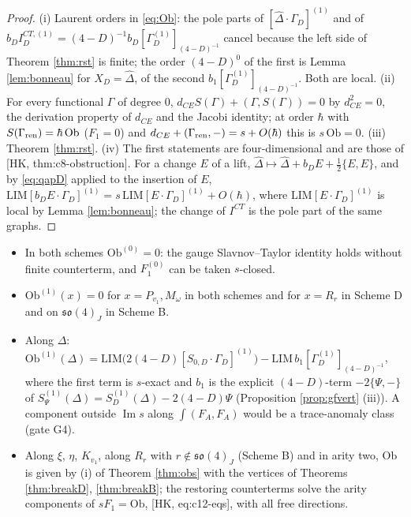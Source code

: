 \begin{proof}
(i) Laurent orders in \eqref{eq:Ob}: the pole parts of $[\widehat\Delta\cdot\Gamma_D]^{(1)}$ and of $b_DI^{CT,(1)}_D=(4-D)^{-1}b_D[\Gamma^{(1)}_D]_{(4-D)^{-1}}$ cancel because the left side of Theorem \ref{thm:rst} is finite; the order $(4-D)^0$ of the first is Lemma \ref{lem:bonneau} for $X_D=\widehat\Delta$, of the second $b_1[\Gamma^{(1)}_D]_{(4-D)^{-1}}$. Both are local. (ii) For every functional $\Gamma$ of degree $0$, $d_{CE}S(\Gamma)+(\Gamma,S(\Gamma))=0$ by $d_{CE}^2=0$, the derivation property of $d_{CE}$ and the Jacobi identity; at order $\hbar$ with $S(\Gamma_{\rm ren})=\hbar\,\mathrm{Ob}$ ($F_1=0$) and $d_{CE}+(\Gamma_{\rm ren},-)=s+O(\hbar)$ this is $s\,\mathrm{Ob}=0$. (iii) Theorem \ref{thm:rst}. (iv) The first statements are four-dimensional and are those of [HK, thm:c8-obstruction]. For a change $E$ of a lift, $\widehat\Delta\mapsto\widehat\Delta+b_DE+\frac12\{E,E\}$, and by \eqref{eq:qapD} applied to the insertion of $E$, $\mathrm{LIM}[b_DE\cdot\Gamma_D]^{(1)}=s\,\mathrm{LIM}[E\cdot\Gamma_D]^{(1)}+O(\hbar)$, where $\mathrm{LIM}[E\cdot\Gamma_D]^{(1)}$ is local by Lemma \ref{lem:bonneau}; the change of $I^{CT}$ is the pole part of the same graphs.
\end{proof}

\begin{theorem}
\label{thm:restore}
\mbox{}\begin{itemize}
\item[(i)] In both schemes $\mathrm{Ob}^{(0)}=0$: the gauge Slavnov--Taylor identity holds without finite counterterm, and $F^{(0)}_1$ can be taken $s$-closed.
\item[(ii)] $\mathrm{Ob}^{(1)}(x)=0$ for $x=P_{v_1},M_\omega$ in both schemes and for $x=R_r$ in Scheme D and on $\mathfrak{so}(4)_J$ in Scheme B.
\item[(iii)] Along $\Delta$: $\mathrm{Ob}^{(1)}(\Delta)=\mathrm{LIM}\big(2(4-D)[S_{0,D}\cdot\Gamma_D]^{(1)}\big)-\mathrm{LIM}\,b_1[\Gamma^{(1)}_D]_{(4-D)^{-1}}$, where the first term is $s$-exact and $b_1$ is the explicit $(4-D)$-term $-2\{\Psi,-\}$ of $S^{(1)}_\Psi(\Delta)=S^{(1)}_D(\Delta)-2(4-D)\Psi$ (Proposition \ref{prop:gfvert} (iii)). A component outside $\operatorname{Im}s$ along $\int(F_A,F_A)$ would be a trace-anomaly class (gate G4).
\item[(iv)] Along $\xi$, $\eta$, $K_{v_1}$, along $R_r$ with $r\notin\mathfrak{so}(4)_J$ (Scheme B) and in arity two, $\mathrm{Ob}$ is given by (i) of Theorem \ref{thm:obs} with the vertices of Theorems \ref{thm:breakD}, \ref{thm:breakB}; the restoring counterterms solve the arity components of $sF_1=\mathrm{Ob}$, [HK, eq:c12-eqs], with all free directions.
\end{itemize}
\end{theorem}

